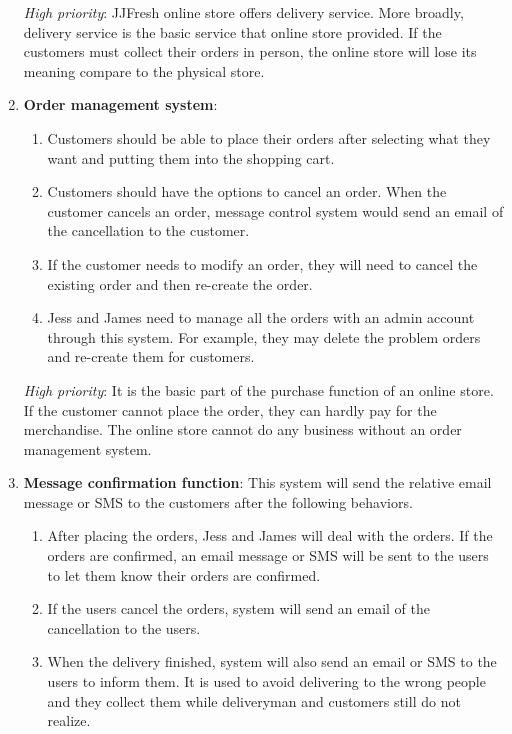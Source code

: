 \documentclass{report}
\begin{document}
\begin{enumerate}
  \textit{High priority}: JJFresh online store offers delivery service. More broadly, delivery service is the basic service that online store provided. If the customers must collect their orders in person, the online store will lose its meaning compare to the physical store.

  \item \textbf{Order management system}:  
  \begin{enumerate}
    \item Customers should be able to place their orders after selecting what they want and putting them into the shopping cart.
    \item Customers should have the options to cancel an order. When the customer cancels an order, message control system would send an email of the cancellation to the customer.
    \item If the customer needs to modify an order, they will need to cancel the existing order and then re-create the order.
    \item Jess and James need to manage all the orders with an admin account through this system. For example, they may delete the problem orders and re-create them for customers.
  \end{enumerate}

  \textit{High priority}: It is the basic part of the purchase function of an online store. If the customer cannot place the order, they can hardly pay for the merchandise. The online store cannot do any business without an order management system.

  \item \textbf{Message confirmation function}: This system will send the relative email message or SMS to the customers after the following behaviors.
  \begin{enumerate}
    \item After placing the orders, Jess and James will deal with the orders. If the orders are confirmed, an email message or SMS will be sent to the users to let them know their orders are confirmed.
    \item If the users cancel the orders, system will send an email of the cancellation to the users.
    \item When the delivery finished, system will also send an email or SMS to the users to inform them. It is used to avoid delivering to the wrong people and they collect them while deliveryman and customers still do not realize.  
  \end{enumerate}
  

\end{enumerate}
\end{document}
